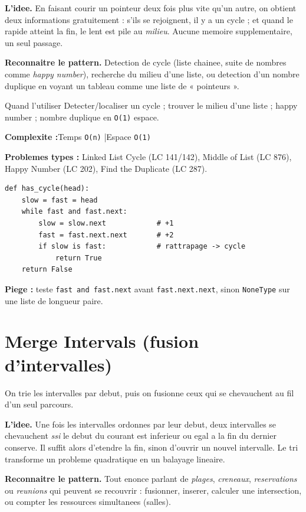 \documentclass[11pt,a4paper]{article}
\newcommand{\complexite}[2]{%
  \noindent\textbf{Complexite :}\quad Temps \texttt{#1} \quad|\quad Espace \texttt{#2}\par\smallskip}
\newcommand{\leetcode}[1]{\noindent\textbf{Problemes types :} #1\par\medskip}
\begin{document}
\textbf{L'idee.} En faisant courir un pointeur deux fois plus vite qu'un autre, on
obtient deux informations gratuitement : s'ils se rejoignent, il y a un cycle ;
et quand le rapide atteint la fin, le lent est pile au \emph{milieu}. Aucune
memoire supplementaire, un seul passage.

\textbf{Reconnaitre le pattern.} Detection de cycle (liste chainee, suite de
nombres comme \emph{happy number}), recherche du milieu d'une liste, ou detection
d'un nombre duplique en voyant un tableau comme une liste de « pointeurs ».

\begin{infobox}{Quand l'utiliser}
Detecter/localiser un cycle ; trouver le milieu d'une liste ; happy number ;
nombre duplique en \texttt{O(1)} espace.
\end{infobox}

\complexite{O(n)}{O(1)}
\leetcode{Linked List Cycle (LC 141/142), Middle of List (LC 876), Happy Number (LC 202), Find the Duplicate (LC 287).}

\begin{lstlisting}
def has_cycle(head):
    slow = fast = head
    while fast and fast.next:
        slow = slow.next            # +1
        fast = fast.next.next       # +2
        if slow is fast:            # rattrapage -> cycle
            return True
    return False
\end{lstlisting}

\textbf{Piege :} teste \texttt{fast and fast.next} avant \texttt{fast.next.next},
sinon \texttt{NoneType} sur une liste de longueur paire.

\section{Merge Intervals (fusion d'intervalles)}
On trie les intervalles par debut, puis on fusionne ceux qui se chevauchent au fil
d'un seul parcours.

\textbf{L'idee.} Une fois les intervalles ordonnes par leur debut, deux intervalles
se chevauchent \emph{ssi} le debut du courant est inferieur ou egal a la fin du
dernier conserve. Il suffit alors d'etendre la fin, sinon d'ouvrir un nouvel
intervalle. Le tri transforme un probleme quadratique en un balayage lineaire.

\textbf{Reconnaitre le pattern.} Tout enonce parlant de \emph{plages},
\emph{creneaux}, \emph{reservations} ou \emph{reunions} qui peuvent se recouvrir :
fusionner, inserer, calculer une intersection, ou compter les ressources
simultanees (salles).
\end{document}
